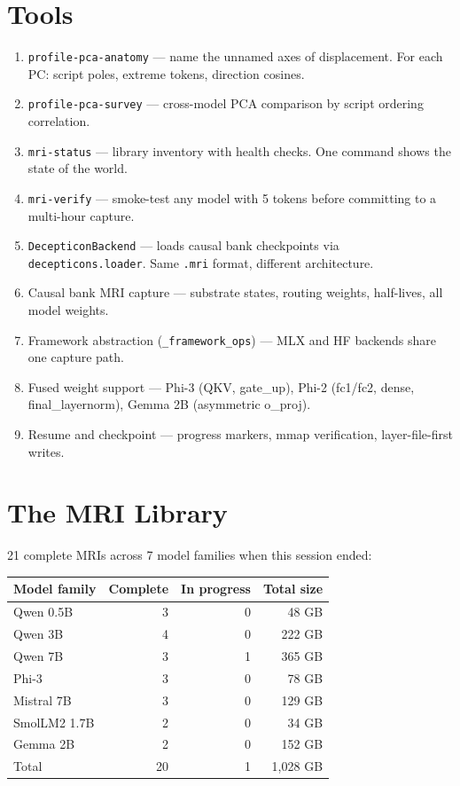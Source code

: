 \documentclass[11pt,a4paper]{report}
\begin{document}
\section{Tools}

\begin{enumerate}[nosep]
\item \texttt{profile-pca-anatomy} --- name the unnamed axes of displacement. For each PC: script poles, extreme tokens, direction cosines.
\item \texttt{profile-pca-survey} --- cross-model PCA comparison by script ordering correlation.
\item \texttt{mri-status} --- library inventory with health checks. One command shows the state of the world.
\item \texttt{mri-verify} --- smoke-test any model with 5 tokens before committing to a multi-hour capture.
\item \texttt{DecepticonBackend} --- loads causal bank checkpoints via \texttt{decepticons.loader}. Same \texttt{.mri} format, different architecture.
\item Causal bank MRI capture --- substrate states, routing weights, half-lives, all model weights.
\item Framework abstraction (\texttt{\_framework\_ops}) --- MLX and HF backends share one capture path.
\item Fused weight support --- Phi-3 (QKV, gate\_up), Phi-2 (fc1/fc2, dense, final\_layernorm), Gemma 2B (asymmetric o\_proj).
\item Resume and checkpoint --- progress markers, mmap verification, layer-file-first writes.
\end{enumerate}

\section{The MRI Library}

21 complete MRIs across 7 model families when this session ended:

\begin{center}
\begin{tabular}{lrrr}
\toprule
\textbf{Model family} & \textbf{Complete} & \textbf{In progress} & \textbf{Total size} \\
\midrule
Qwen 0.5B & 3 & 0 & 48 GB \\
Qwen 3B & 4 & 0 & 222 GB \\
Qwen 7B & 3 & 1 & 365 GB \\
Phi-3 & 3 & 0 & 78 GB \\
Mistral 7B & 3 & 0 & 129 GB \\
SmolLM2 1.7B & 2 & 0 & 34 GB \\
Gemma 2B & 2 & 0 & 152 GB \\
\midrule
Total & 20 & 1 & 1,028 GB \\
\bottomrule
\end{tabular}
\end{center}
\end{document}
